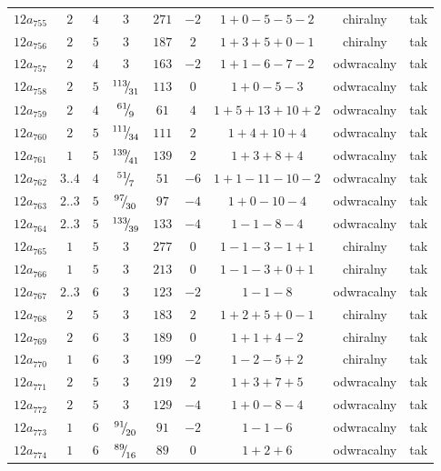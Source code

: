 \begin{longtable}{ccccccccc}
$12a_{755}$ & $2$ & $4$ & $3$ & $271$ & $-2$ & $1+0-5-5-2$ & chiralny & tak \\
$12a_{756}$ & $2$ & $5$ & $3$ & $187$ & $2$ & $1+3+5+0-1$ & chiralny & tak \\
$12a_{757}$ & $2$ & $4$ & $3$ & $163$ & $-2$ & $1+1-6-7-2$ & odwracalny & tak \\
$12a_{758}$ & $2$ & $5$ & ${}^{113}{\mskip -5mu/\mskip -3mu}_{31}$ & $113$ & $0$ & $1+0-5-3$ & odwracalny & tak \\
$12a_{759}$ & $2$ & $4$ & ${}^{61}{\mskip -5mu/\mskip -3mu}_{9}$ & $61$ & $4$ & $1+5+13+10+2$ & odwracalny & tak \\
$12a_{760}$ & $2$ & $5$ & ${}^{111}{\mskip -5mu/\mskip -3mu}_{34}$ & $111$ & $2$ & $1+4+10+4$ & odwracalny & tak \\
$12a_{761}$ & $1$ & $5$ & ${}^{139}{\mskip -5mu/\mskip -3mu}_{41}$ & $139$ & $2$ & $1+3+8+4$ & odwracalny & tak \\
$12a_{762}$ & $3..4$ & $4$ & ${}^{51}{\mskip -5mu/\mskip -3mu}_{7}$ & $51$ & $-6$ & $1+1-11-10-2$ & odwracalny & tak \\
$12a_{763}$ & $2..3$ & $5$ & ${}^{97}{\mskip -5mu/\mskip -3mu}_{30}$ & $97$ & $-4$ & $1+0-10-4$ & odwracalny & tak \\
$12a_{764}$ & $2..3$ & $5$ & ${}^{133}{\mskip -5mu/\mskip -3mu}_{39}$ & $133$ & $-4$ & $1-1-8-4$ & odwracalny & tak \\
$12a_{765}$ & $1$ & $5$ & $3$ & $277$ & $0$ & $1-1-3-1+1$ & chiralny & tak \\
$12a_{766}$ & $1$ & $5$ & $3$ & $213$ & $0$ & $1-1-3+0+1$ & chiralny & tak \\
$12a_{767}$ & $2..3$ & $6$ & $3$ & $123$ & $-2$ & $1-1-8$ & odwracalny & tak \\
$12a_{768}$ & $2$ & $5$ & $3$ & $183$ & $2$ & $1+2+5+0-1$ & chiralny & tak \\
$12a_{769}$ & $2$ & $6$ & $3$ & $189$ & $0$ & $1+1+4-2$ & chiralny & tak \\
$12a_{770}$ & $1$ & $6$ & $3$ & $199$ & $-2$ & $1-2-5+2$ & chiralny & tak \\
$12a_{771}$ & $2$ & $5$ & $3$ & $219$ & $2$ & $1+3+7+5$ & odwracalny & tak \\
$12a_{772}$ & $2$ & $5$ & $3$ & $129$ & $-4$ & $1+0-8-4$ & odwracalny & tak \\
$12a_{773}$ & $1$ & $6$ & ${}^{91}{\mskip -5mu/\mskip -3mu}_{20}$ & $91$ & $-2$ & $1-1-6$ & odwracalny & tak \\
$12a_{774}$ & $1$ & $6$ & ${}^{89}{\mskip -5mu/\mskip -3mu}_{16}$ & $89$ & $0$ & $1+2+6$ & odwracalny & tak \\

\end{longtable}
